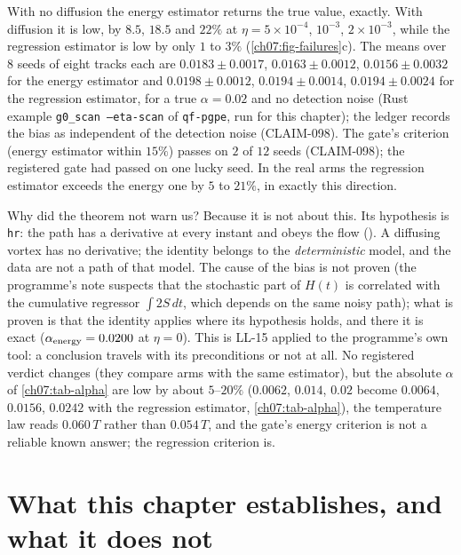 With no diffusion the energy estimator returns the true value, exactly. With diffusion it is low, by $8.5$, $18.5$ and $22\%$ at $\eta=5\times10^{-4}$, $10^{-3}$, $2\times10^{-3}$, while the regression estimator is low by only $1$ to $3\%$ (\cref{ch07:fig-failures}c). The means over 8 seeds of eight tracks each are $0.0183\pm0.0017$, $0.0163\pm0.0012$, $0.0156\pm0.0032$ for the energy estimator and $0.0198\pm0.0012$, $0.0194\pm0.0014$, $0.0194\pm0.0024$ for the regression estimator, for a true $\alpha=0.02$ and no detection noise (Rust example \texttt{g0\_scan --eta-scan} of \texttt{qf-pgpe}, run for this chapter); the ledger records the bias as independent of the detection noise (CLAIM-098). The gate's criterion (energy estimator within $15\%$) passes on $2$ of $12$ seeds (CLAIM-098); the registered gate had
passed on one lucky seed. In the real arms the regression estimator exceeds the energy one by $5$ to $21\%$, in exactly this direction.

Why did the theorem not warn us? Because it is not about this. Its hypothesis is \texttt{hr}: the path has a derivative at every instant and obeys the flow (). A diffusing vortex has no derivative; the identity belongs to the \emph{deterministic} model, and the data are not a path of that model. The cause of the bias is not proven (the programme's note suspects that the stochastic part of $H(t)$ is
correlated with the cumulative regressor $\int2S\,dt$, which depends on the same noisy path); what is proven is that the identity applies where its hypothesis holds, and there it is exact ($\alpha_{\rm energy}=0.0200$ at $\eta=0$). This is LL-15 applied to the programme's own tool: a conclusion travels with its preconditions or not at all. No registered verdict changes (they compare arms with the same estimator), but the absolute $\alpha$ of \cref{ch07:tab-alpha}
are low by about $5$--$20\%$ ($0.0062$, $0.014$, $0.02$ become $0.0064$, $0.0156$, $0.0242$ with the regression estimator, \cref{ch07:tab-alpha}), the temperature law reads $0.060\,T$ rather than $0.054\,T$, and the gate's energy criterion is not a reliable known answer; the regression criterion is.

\section{What this chapter establishes, and what it does not}\label{ch07:honest}

